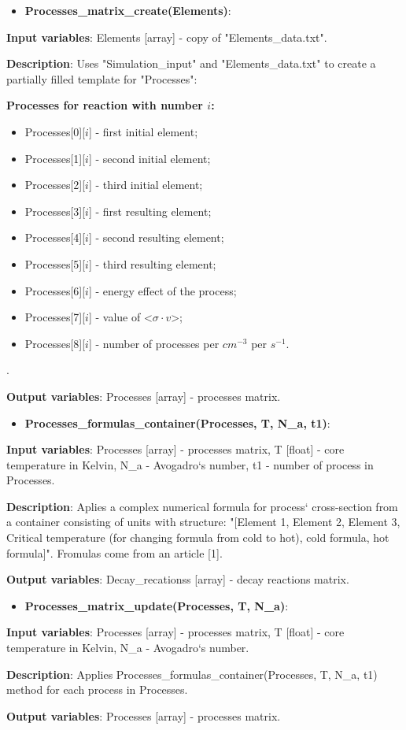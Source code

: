 \documentclass[a4paper,12pt]{article}
\newcommand{\namefunction}[4]{
  \begin{itemize}
    \item \textbf{#1}:
  \end{itemize}
  
  \textbf{Input variables}: #2.
  
  \textbf{Description}: #3.
  
  \textbf{Output variables}: #4.
}
\begin{document}
\namefunction{Processes\_matrix\_create(Elements)}{Elements [array] - copy of "Elements\_data.txt"}{Uses "Simulation\_input" and "Elements\_data.txt" to create a partially filled template for "Processes":

\textbf{Processes for reaction with number $i$:}
\begin{itemize}
    \item Processes[0][$i$] - first initial element;
    \item Processes[1][$i$] - second initial element;
    \item Processes[2][$i$] - third initial element;
    \item Processes[3][$i$] - first resulting element;
    \item Processes[4][$i$] - second resulting element;
    \item Processes[5][$i$] - third resulting element;
    \item Processes[6][$i$] - energy effect of the process;
    \item Processes[7][$i$] - value of <$\sigma \cdot v$>;
    \item Processes[8][$i$] - number of processes per $cm^{-3}$ per $s^{-1}$.
\end{itemize}

}{Processes [array] - processes matrix}

\vspace{1em}

\namefunction{Processes\_formulas\_container(Processes, T, N\_a, t1)}{Processes [array] - processes matrix, T [float] - core temperature in Kelvin, N\_a - Avogadro`s number, t1 - number of process in Processes}{Aplies a complex numerical formula for process` cross-section from a container consisting of units with structure: "[Element 1, Element 2, Element 3, Critical temperature (for changing formula from cold to hot), cold formula, hot formula]". Fromulas come from an article [1]}{Decay\_recationss [array] - decay reactions matrix}

\vspace{1em}

\namefunction{Processes\_matrix\_update(Processes, T, N\_a)}{Processes [array] - processes matrix, T [float] - core temperature in Kelvin, N\_a - Avogadro`s number}{Applies Processes\_formulas\_container(Processes, T, N\_a, t1) method for each process in Processes}{Processes [array] - processes matrix}


\vspace{1em}
\end{document}

